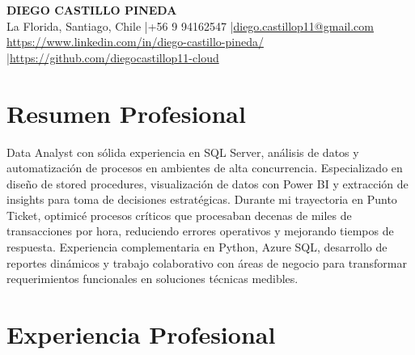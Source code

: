 \documentclass[11pt,letterpaper]{article}
\begin{document}
\begin{center}
{\fontsize{16}{19}\selectfont\textbf{\MakeUppercase{Diego Castillo Pineda}}}\\[4pt]
{\small La Florida, Santiago, Chile \quad|\quad +56 9 94162547 \quad|\quad \href{mailto:diego.castillop11@gmail.com}{diego.castillop11@gmail.com}\\
\href{https://https://www.linkedin.com/in/diego-castillo-pineda/}{https://www.linkedin.com/in/diego-castillo-pineda/} \quad|\quad \href{https://https://github.com/diegocastillop11-cloud}{https://github.com/diegocastillop11-cloud}}
\end{center}

\section{Resumen Profesional}
Data Analyst con sólida experiencia en SQL Server, análisis de datos y automatización de procesos en ambientes de alta concurrencia. Especializado en diseño de stored procedures, visualización de datos con Power BI y extracción de insights para toma de decisiones estratégicas. Durante mi trayectoria en Punto Ticket, optimicé procesos críticos que procesaban decenas de miles de transacciones por hora, reduciendo errores operativos y mejorando tiempos de respuesta. Experiencia complementaria en Python, Azure SQL, desarrollo de reportes dinámicos y trabajo colaborativo con áreas de negocio para transformar requerimientos funcionales en soluciones técnicas medibles.

\section{Experiencia Profesional}
\end{document}
